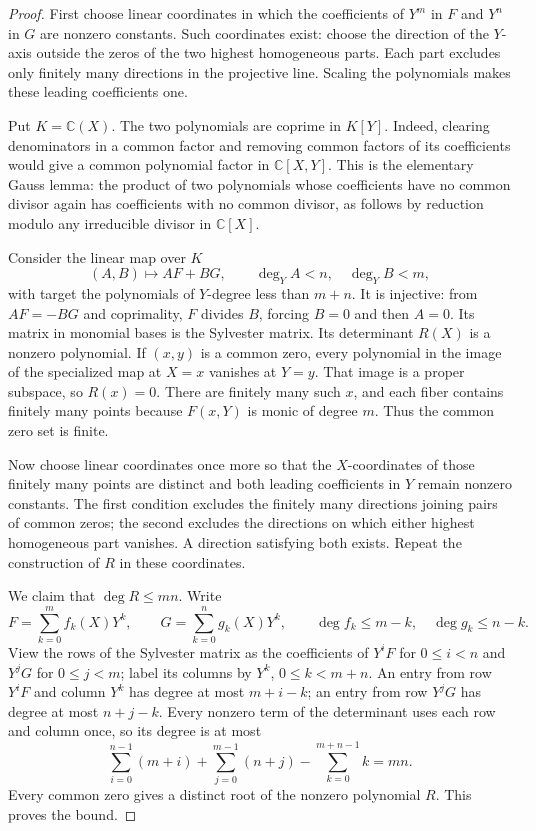 \begin{proof}
First choose linear coordinates in which the coefficients of $Y^m$
in $F$ and $Y^n$ in $G$ are nonzero constants.  Such coordinates exist:
choose the direction of the $Y$-axis outside the zeros of the two
highest homogeneous parts.  Each part excludes only finitely many
directions in the projective line.  Scaling the polynomials makes
these leading coefficients one.

Put $K=\mathbb C(X)$.  The two polynomials are coprime in $K[Y]$.
Indeed, clearing denominators in a common factor and removing common
factors of its coefficients would give a common polynomial factor
in $\mathbb C[X,Y]$.  This is the elementary Gauss lemma: the product
of two polynomials whose coefficients have no common divisor again
has coefficients with no common divisor, as follows by reduction
modulo any irreducible divisor in $\mathbb C[X]$.

Consider the linear map over $K$
\begin{equation}\label{eq:elementary-sylvester-map}
 (A,B)\longmapsto AF+BG,
 \qquad \deg_Y A<n,\quad\deg_Y B<m,
\end{equation}
with target the polynomials of $Y$-degree less than $m+n$.
It is injective: from $AF=-BG$ and coprimality, $F$ divides $B$,
forcing $B=0$ and then $A=0$.  Its matrix in monomial bases is the
Sylvester matrix.  Its determinant $R(X)$ is a nonzero polynomial.
If $(x,y)$ is a common zero, every polynomial in the image of the
specialized map at $X=x$ vanishes at $Y=y$.  That image is a proper
subspace, so $R(x)=0$.  There are finitely many such $x$, and each
fiber contains finitely many points because $F(x,Y)$ is monic of
degree $m$.  Thus the common zero set is finite.

Now choose linear coordinates once more so that the $X$-coordinates
of those finitely many points are distinct and both leading
coefficients in $Y$ remain nonzero constants.  The first condition
excludes the finitely many directions joining pairs of common zeros;
the second excludes the directions on which either highest
homogeneous part vanishes.  A direction satisfying both exists.
Repeat the construction of $R$ in these coordinates.

We claim that $\deg R\le mn$.  Write
\[
 F=\sum_{k=0}^{m}f_k(X)Y^k,\qquad
 G=\sum_{k=0}^{n}g_k(X)Y^k,
 \qquad \deg f_k\le m-k,\quad\deg g_k\le n-k.
\]
View the rows of the Sylvester matrix as the coefficients of
$Y^iF$ for $0\le i<n$ and $Y^jG$ for $0\le j<m$; label its columns
by $Y^k$, $0\le k<m+n$.  An entry from row $Y^iF$ and column $Y^k$
has degree at most $m+i-k$; an entry from row $Y^jG$ has degree at
most $n+j-k$.  Every nonzero term of the determinant uses each row
and column once, so its degree is at most
\[
 \sum_{i=0}^{n-1}(m+i)+\sum_{j=0}^{m-1}(n+j)
       -\sum_{k=0}^{m+n-1}k=mn.
\]
Every common zero gives a distinct root of the nonzero polynomial
$R$.  This proves the bound.
\end{proof}

